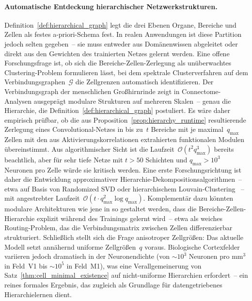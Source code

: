 ﻿\documentclass[12pt, a4paper, openany]{report}
\newcommand{\calG}{\mathcal{G}}
\begin{document}
\paragraph{Automatische Entdeckung hierarchischer Netzwerkstrukturen.}
Definition~\ref{def:hierarchical_graph} legt die drei Ebenen Organe,
Bereiche und Zellen als festes a-priori-Schema fest.  In realen
Anwendungen ist diese Partition jedoch selten gegeben~-- sie muss entweder
aus Domänenwissen abgeleitet oder direkt aus den Gewichten des trainierten
Netzes gelernt werden.  Eine offene Forschungsfrage ist, ob sich die
Bereiche-Zellen-Zerlegung als unüberwachtes Clustering-Problem formulieren
lässt, bei dem spektrale Clusterverfahren auf dem Verbindungsgraphen~$\calG$
die Zellgrenzen automatisch identifizieren.
Der Verbindungsgraph der menschlichen Großhirnrinde zeigt in Connectome-
Analysen \cite{sporns05} ausgeprägt modulare Strukturen auf mehreren
Skalen~-- genau die Hierarchie, die Definition~\ref{def:hierarchical_graph}
postuliert.  Es wäre daher empirisch prüfbar, ob die aus
Proposition~\ref{prop:hierarchy_runtime} resultierende Zerlegung eines
Convolutional-Netzes in bis zu~$t$ Bereiche mit je maximal~$q_{\max}$ Zellen
mit den aus Aktivierungskorrelationen extrahierten funktionalen Modulen übereinstimmt.
Aus algorithmischer Sicht ist die Laufzeit~$\mathcal{O}(t^2 q_{\max}^3)$
bereits beachtlich, aber für sehr tiefe Netze mit $t > 50$ Schichten und
$q_{\max} > 10^3$ Neuronen pro Zelle würde sie kritisch werden.  Eine erste
Forschungsrichtung ist daher die Entwicklung approximativer
Hierarchie-Dekompositionsalgorithmen~-- etwa auf Basis von Randomized SVD
oder hierarchischem Louvain-Clustering \cite{barabasi99}~-- mit angestrebter
Laufzeit~$\mathcal{O}(t \cdot q_{\max}^2 \log q_{\max})$.  Komplementär
dazu könnten modulare Architekturen wie jene in \cite{goyal22} so gestaltet
werden, dass die Bereiche-Zellen-Hierarchie explizit während des Trainings
gelernt wird~-- etwa als weiches Routing-Problem, das die Verbindungsmatrix
zwischen Zellen differenzierbar strukturiert.
Schließlich stellt sich die Frage anisotroper Zellgrößen: Das aktuelle Modell
setzt annähernd uniforme Zellgrößen~$q$ voraus.  Biologische Cortexfelder
variieren jedoch dramatisch in der Neuronendichte (von $\sim\!10^3$ Neuronen
pro mm$^3$ in Feld~V1 bis $\sim\!10^5$ in Feld~M1), was eine Verallgemeinerung
von Satz~\ref{thm:cell_minimal_existence} auf nicht-uniforme Hierarchien
erfordert~-- ein reines formales Ergebnis, das zugleich als Grundlage für
datengetriebenes Hierarchielernen dient.
\end{document}
